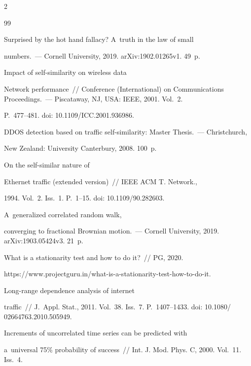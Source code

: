 \begin{multicols}{2}
{{\begin{thebibliography}{99}


 Surprised by the hot hand fallacy? A~truth in the law of small 


numbers.~--- Cornell University, 2019. arXiv:1902.01265v1.  49~p.




 Impact of self-similarity on wireless data 


Network performance~//  Conference (International) on Communications Proceedings.~--- Piscataway, NJ, USA: IEEE, 2001. Vol.~2. 


P.~477--481. doi: 10.1109/ICC.2001.936986.




 DDOS detection based on traffic self-similarity: Master Thesis.~--- Christchurch, 


New Zealand: University Canterbury, 2008. 100~p.




 On the self-similar nature of 


Ethernet traffic (extended version)~// IEEE ACM T. Network., 


1994. Vol.~2. Iss.~1. P.~1--15. doi: 10.1109/90.282603.




 A~generalized correlated random walk, 


converging to fractional Brownian motion.~--- Cornell University, 2019. arXiv:1903.05424v3. 21~p.




 What is a stationarity test and how to do it?~// PG, 2020. 


{\sf https://www.projectguru.in/what-is-a-stationarity-test-how-to-do-it}.




 Long-range dependence analysis of internet 


traffic~// J.~Appl. Stat., 2011. Vol.~38. Iss.~7. P.~1407--1433. doi: 10.1080/ 02664763.2010.505949.




 Increments of uncorrelated time series can be predicted with 


a~universal 75\% probability of success~// Int. J. Mod. Phys. C, 2000. Vol.~11. Iss.~4.  



\end{thebibliography}}}
\end{multicols}
